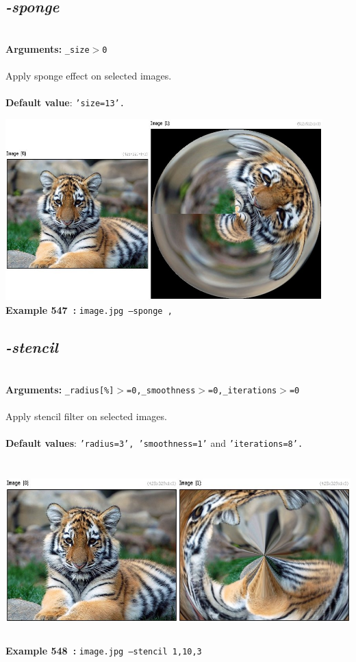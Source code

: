 \documentclass[a4paper,11pt,twoside]{book}
\begin{document}
\subsection{\emph{-sponge} }\vspace*{-0.5em}
~\\\textbf{Arguments: } 
{\small \texttt{\_size$>$0}}\\~\\
Apply sponge effect on selected images.
~\\~\\\textbf{Default value}: {\small \texttt{'size=13'.}}
\begin{center}\includegraphics[keepaspectratio=true,height=7cm,width=\textwidth]{img/gmic_def547.jpg}\\
{\footnotesize \textbf{Example 547~:} \texttt{image.jpg --sponge ,}}
\end{center}

\subsection{\emph{-stencil} }\vspace*{-0.5em}
~\\\textbf{Arguments: } 
{\small \texttt{\_radius[\%]$>$=0,\_smoothness$>$=0,\_iterations$>$=0}}\\~\\
Apply stencil filter on selected images.
~\\~\\\textbf{Default values}: {\small \texttt{'radius=3', 'smoothness=1'} and \texttt{'iterations=8'.}}
\begin{center}\includegraphics[keepaspectratio=true,height=7cm,width=\textwidth]{img/gmic_def548.jpg}\\
{\footnotesize \textbf{Example 548~:} \texttt{image.jpg --stencil 1,10,3}}
\end{center}
\end{document}
